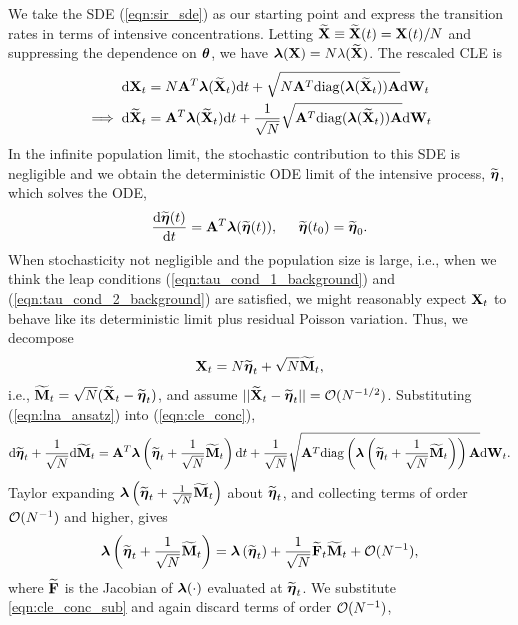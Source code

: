 We take the SDE (\ref{eqn:sir_sde}) as our starting point and express the transition rates in terms of intensive concentrations. Letting $ \widetilde{\mathbf{X}} \equiv \widetilde{\mathbf{X}}(t) = \mathbf{X}(t)/N $ and suppressing the dependence on $ \boldsymbol{\theta} $, we have $  \boldsymbol{\lambda}(\mathbf{X}) = N\lambda(\widetilde{\mathbf{X}}) $. The rescaled CLE is 
\begin{align}
\mathrm{d} \mathbf{X}_t &= N\mathbf{A}^T\boldsymbol{\lambda}(\widetilde{\mathbf{X}}_t)\mathrm{d} t + \sqrt{N\mathbf{A}^T\mathrm{diag}(\boldsymbol{\lambda}(\widetilde{\mathbf{X}}_t))\mathbf{A}}\mathrm{d}\mathbf{W}_t \nonumber\\
\label{eqn:cle_conc}
\implies \mathrm{d}\widetilde{\mathbf{X}}_t &= \mathbf{A}^T\boldsymbol{\lambda}(\widetilde{\mathbf{X}}_t)\mathrm{d} t + \frac{1}{\sqrt{N}}\sqrt{\mathbf{A}^T\mathrm{diag}(\boldsymbol{\lambda}(\widetilde{\mathbf{X}}_t))\mathbf{A}}\mathrm{d}\mathbf{W}_t
\end{align}
In the infinite population limit, the stochastic contribution to this SDE is negligible and we obtain the deterministic ODE limit of the intensive process, $ \widetilde{\boldsymbol{\eta}} $, which solves the ODE,
\begin{equation}
\label{eqn:lna_drift}
\frac{\mathrm{d}\widetilde{\boldsymbol{\eta}}(t)}{\mathrm{d} t} = \mathbf{A}^T\boldsymbol{\lambda}(\widetilde{\boldsymbol{\eta}}(t)),\hspace{0.2in} \widetilde{\boldsymbol{\eta}}(t_0)=\widetilde{\boldsymbol{\eta}}_0.
\end{equation}
When stochasticity not negligible and the population size is large, i.e., when we think the leap conditions (\ref{eqn:tau_cond_1_background}) and (\ref{eqn:tau_cond_2_background}) are satisfied, we might reasonably expect $ \mathbf{X}_t $ to behave like its deterministic limit plus residual Poisson variation. Thus, we decompose
\begin{equation}
\label{eqn:lna_ansatz}
\mathbf{X}_t = N\widetilde{\boldsymbol{\eta}}_t + \sqrt{N}\widetilde{\mathbf{M}}_t,
\end{equation}
 i.e., $ \widetilde{\mathbf{M}}_t = \sqrt{N}(\widetilde{\mathbf{X}}_t - \widetilde{\boldsymbol{\eta}}_t) $, and assume $ ||\widetilde{\mathbf{X}}_t - \widetilde{\boldsymbol{\eta}}_t|| = \mathcal{O}(N^{-1/2}) $. Substituting (\ref{eqn:lna_ansatz}) into (\ref{eqn:cle_conc}),
 \begin{equation}
 \label{eqn:cle_conc_sub}
 \mathrm{d}\widetilde{\boldsymbol{\eta}}_t + \frac{1}{\sqrt{N}}\mathrm{d}\widetilde{\mathbf{M}}_t = \mathbf{A}^T\boldsymbol{\lambda}\left (\widetilde{\boldsymbol{\eta}}_t + \frac{1}{\sqrt{N}}\widetilde{\mathbf{M}}_t\right )\mathrm{d} t + \frac{1}{\sqrt{N}}\sqrt{\mathbf{A}^T\mathrm{diag}\left (\boldsymbol{\lambda}\left (\widetilde{\boldsymbol{\eta}}_t + \frac{1}{\sqrt{N}}\widetilde{\mathbf{M}}_t\right )\right )\mathbf{A}}\mathrm{d}\mathbf{W}_t. 
 \end{equation}
Taylor expanding $ \boldsymbol{\lambda}\left (\widetilde{\boldsymbol{\eta}}_t + \frac{1}{\sqrt{N}}\widetilde{\mathbf{M}}_t\right ) $ about $ \widetilde{\boldsymbol{\eta}}_t $, and collecting terms of order $ \mathcal{O}(N^{-1}) $ and higher, gives $$\boldsymbol{\lambda}\left (\widetilde{\boldsymbol{\eta}}_t + \frac{1}{\sqrt{N}}\widetilde{\mathbf{M}}_t\right ) = \boldsymbol{\lambda}\left (\widetilde{\boldsymbol{\eta}}_t\right ) + \frac{1}{\sqrt{N}}\widetilde{\mathbf{F}}_t\widetilde{\mathbf{M}}_t + \mathcal{O}(N^{-1}),$$
where $ \widetilde{\mathbf{F}} $ is the Jacobian of $ \boldsymbol{\lambda}(\cdot) $ evaluated at $ \widetilde{\boldsymbol{\eta}}_t $. We substitute \ref{eqn:cle_conc_sub} and again discard terms of order $ \mathcal{O}(N^{-1}) $,
